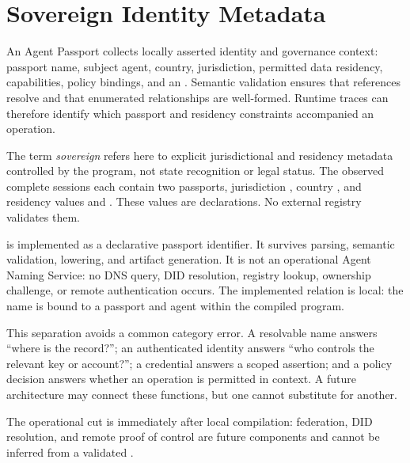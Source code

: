\section{Sovereign Identity Metadata}\label{sec:sovereign}

An Agent Passport collects locally asserted identity and governance context:
passport name, subject agent, country, jurisdiction, permitted data residency,
capabilities, policy bindings, and an .  Semantic validation
ensures that references resolve and that enumerated relationships are
well-formed.  Runtime traces can therefore identify which passport and
residency constraints accompanied an operation.

The term \emph{sovereign} refers here to explicit jurisdictional and residency
metadata controlled by the program, not state recognition or legal status.
The observed complete sessions each contain two passports, jurisdiction
, country , and residency values  and .
These values are declarations.  No external registry validates them.

 is implemented as a declarative passport identifier.  It
survives parsing, semantic validation, lowering, and artifact generation.  It
is not an operational Agent Naming Service: no DNS query, DID resolution,
registry lookup, ownership challenge, or remote authentication occurs.
The implemented relation is local: the name is bound to a passport and agent
within the compiled program.

This separation avoids a common category error.  A resolvable name answers
``where is the record?''; an authenticated identity answers ``who controls the
relevant key or account?''; a credential answers a scoped assertion; and a
policy decision answers whether an operation is permitted in context.  A
future architecture may connect these functions, but one cannot substitute
for another.

The operational cut is immediately after local compilation: federation, DID
resolution, and remote proof of control are future components and cannot be
inferred from a validated .
